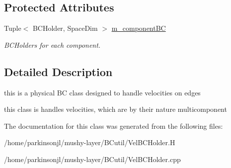 \subsection*{Protected Attributes}
\begin{DoxyCompactItemize}
\item 
\hypertarget{class_edge_vel_b_c_holder_a80cc4520258374af4f7b76851d989bb2}{Tuple$<$ B\-C\-Holder, Space\-Dim $>$ \hyperlink{class_edge_vel_b_c_holder_a80cc4520258374af4f7b76851d989bb2}{m\-\_\-component\-B\-C}}\label{class_edge_vel_b_c_holder_a80cc4520258374af4f7b76851d989bb2}

\begin{DoxyCompactList}\small\item\em B\-C\-Holders for each component. \end{DoxyCompactList}\end{DoxyCompactItemize}


\subsection{Detailed Description}
this is a physical B\-C class designed to handle velocities on edges 

this class is handles velocities, which are by their nature multicomponent 

The documentation for this class was generated from the following files\-:\begin{DoxyCompactItemize}
\item 
/home/parkinsonjl/mushy-\/layer/\-B\-Cutil/Vel\-B\-C\-Holder.\-H\item 
/home/parkinsonjl/mushy-\/layer/\-B\-Cutil/Vel\-B\-C\-Holder.\-cpp\end{DoxyCompactItemize}
